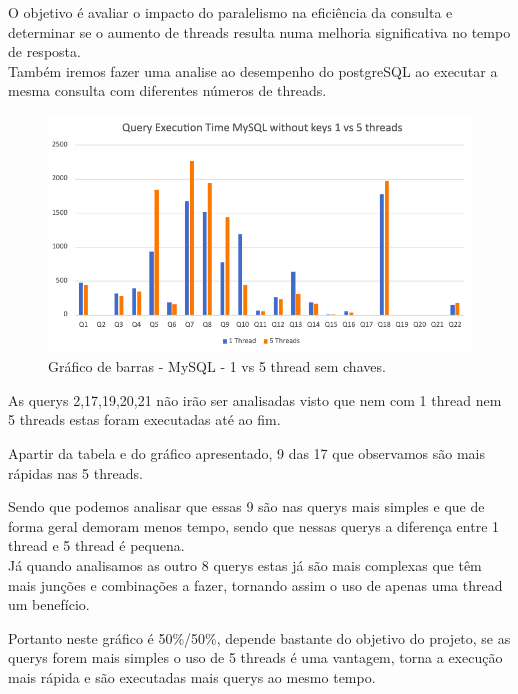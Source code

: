 \documentclass{article}
\begin{document}
  O objetivo é avaliar o impacto do paralelismo na eficiência da consulta e determinar se o aumento de threads resulta numa melhoria significativa no tempo de resposta.\\
  
  Também iremos fazer uma analise ao desempenho do postgreSQL ao executar a mesma consulta com diferentes números de threads.

  \begin{figure}[H]
    \centering
    \includegraphics[width=\textwidth]{Graphs/mysql_withoutkeys_1vs5threads.png}
    \caption{Gráfico de barras - MySQL - 1 vs 5 thread sem chaves.} 
    \label{fig:PKCreation2}
  \end{figure}
  
  As querys 2,17,19,20,21 não irão ser analisadas visto que nem com 1 thread nem 5 threads estas foram executadas até ao fim.

  Apartir da tabela e do gráfico apresentado, 9 das 17 que observamos são mais rápidas nas 5 threads.

  Sendo que podemos analisar que essas 9 são nas querys mais simples e que de forma geral demoram menos tempo, sendo que nessas querys a diferença entre 1 thread e 5 thread é pequena. \\

  Já quando analisamos as outro 8 querys estas já são mais complexas que têm mais junções e combinações a fazer, tornando assim o uso de apenas uma thread um benefício.

  Portanto neste gráfico é 50\%/50\%, depende bastante do objetivo do projeto, se as querys forem mais simples o uso de 5 threads é uma vantagem, torna a execução mais rápida e são executadas mais querys ao mesmo tempo.
\end{document}
